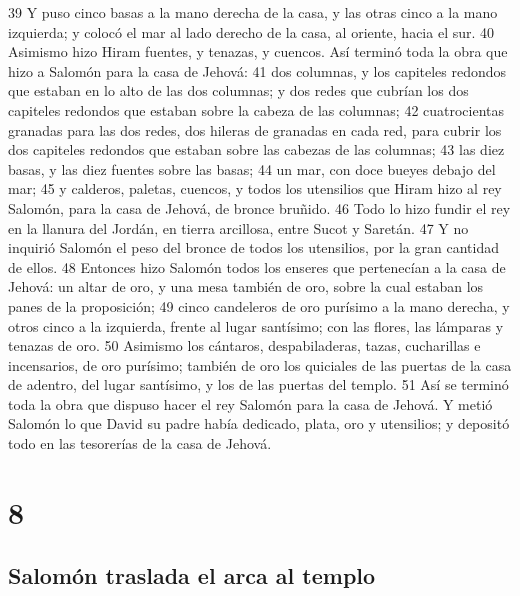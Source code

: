 39 Y puso cinco basas a la mano derecha de la casa, y las otras cinco a la mano izquierda; y colocó el mar al lado derecho de la casa, al oriente, hacia el sur.
40 Asimismo hizo Hiram fuentes, y tenazas, y cuencos. Así terminó toda la obra que hizo a Salomón para la casa de Jehová:
41 dos columnas, y los capiteles redondos que estaban en lo alto de las dos columnas; y dos redes que cubrían los dos capiteles redondos que estaban sobre la cabeza de las columnas;
42 cuatrocientas granadas para las dos redes, dos hileras de granadas en cada red, para cubrir los dos capiteles redondos que estaban sobre las cabezas de las columnas;
43 las diez basas, y las diez fuentes sobre las basas;
44 un mar, con doce bueyes debajo del mar;
45 y calderos, paletas, cuencos, y todos los utensilios que Hiram hizo al rey Salomón, para la casa de Jehová, de bronce bruñido.
46 Todo lo hizo fundir el rey en la llanura del Jordán, en tierra arcillosa, entre Sucot y Saretán.
47 Y no inquirió Salomón el peso del bronce de todos los utensilios, por la gran cantidad de ellos.
48 Entonces hizo Salomón todos los enseres que pertenecían a la casa de Jehová: un altar de oro, y una mesa también de oro, sobre la cual estaban los panes de la proposición;
49 cinco candeleros de oro purísimo a la mano derecha, y otros cinco a la izquierda, frente al lugar santísimo; con las flores, las lámparas y tenazas de oro.
50 Asimismo los cántaros, despabiladeras, tazas, cucharillas e incensarios, de oro purísimo; también de oro los quiciales de las puertas de la casa de adentro, del lugar santísimo, y los de las puertas del templo.
51 Así se terminó toda la obra que dispuso hacer el rey Salomón para la casa de Jehová. Y metió Salomón lo que David su padre había dedicado,  plata, oro y utensilios; y depositó todo en las tesorerías de la casa de Jehová.

\chapter{8}

\section*{Salomón traslada el arca al templo}

